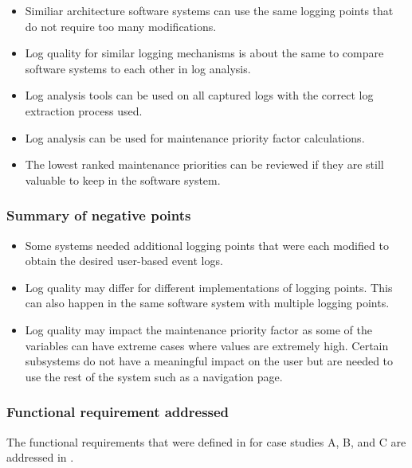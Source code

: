 \begin{itemize}
	\item Similiar architecture software systems can use the same logging points that do not require too many modifications.
	\item Log quality for similar logging mechanisms is about the same to compare software systems to each other in log analysis.
	\item Log analysis tools can be used on all captured logs with the correct log extraction process used.
	\item Log analysis can be used for maintenance priority factor calculations.
	\item The lowest ranked maintenance priorities can be reviewed if they are still valuable to keep in the software system.
\end{itemize}

\subsubsection{Summary of negative points}

\begin{itemize}
	\item Some systems needed additional logging points that were each modified to obtain the desired user-based event logs.
	\item Log quality may differ for different implementations of logging points. This can also happen in the same software system with multiple logging points.
	\item Log quality may impact the maintenance priority factor as some of the variables can have extreme cases where values are extremely high. Certain subsystems do not have a meaningful impact on the user but are needed to use the rest of the system such as a navigation page.
\end{itemize}

\clearpage

\subsubsection{Functional requirement addressed}
The functional requirements that were defined in  for case studies A, B, and C are addressed in .

